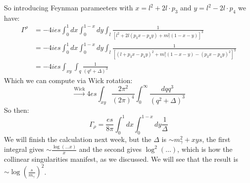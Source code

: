 So introducing Feynman parameeters with $x = l^2  +2l\cdot p_3$ and $y = l^2 - 2l \cdot p_4$ we have:
\begin{equation}
    \begin{split}
        \Gamma^\rho &= -4ies\int_0^1dx \int_0^{1-x}dy \int_l \frac{1}{[l^2 + 2l(p_3x - p_4y) + m_\gamma^2(1-x-y)]^3} 
        \\ &= -4ies\int_0^1dx \int_0^{1-x}dy \int_l \frac{1}{[(l + p_3x - p_4y)^2 + m_\gamma^2(1-x-y) - (p_3x - p_4y)^2]^3} 
        \\ &= -4ies\int_{xy}\int_q \frac{1}{(q^2 + \Delta)^3}
    \end{split}
\end{equation}
Which we can compute via Wick rotation:
\begin{equation}
    \stackrel{\text{Wick}}{\to} 4es \int_{xy}\frac{2\pi^2}{(2\pi)^4}\int_0^\infty \frac{dq q^3}{(q^2 + \Delta)^3}
\end{equation}
So then:
\begin{equation}
    \Gamma_\rho = \frac{es}{8\pi}\int_0^1 dx \int_0^{1-x}dy \frac{1}{\Delta}
\end{equation}
We will finish the calculation next week, but the $\Delta$ is $\sim m_\gamma^2 + xys$, the first integral gives $\sim \frac{\log(\ldots x)}{x}$ and the second gives $\log^2(\ldots)$, which is how the collinear singularities manifest, as we discussed. We will see that the result is $\sim \log(\frac{s}{m_\gamma})^2$.